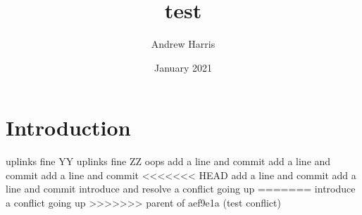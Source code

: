 \documentclass{article}
\title{test}
\author{Andrew Harris}
\date{January 2021}
\begin{document}
\maketitle

\section{Introduction}
uplinks fine YY
uplinks fine ZZ
oops
add a line and commit
add a line and commit
add a line and commit
<<<<<<< HEAD
add a line and commit
add a line and commit
introduce and resolve a conflict going up
=======
introduce a conflict going up
>>>>>>> parent of aef9e1a (test conflict)
\end{document}
